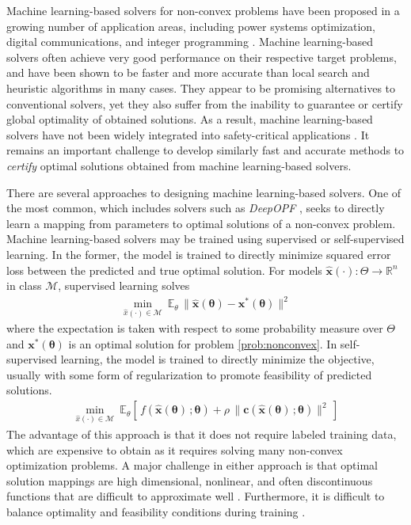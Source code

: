 \documentclass[10pt]{article} %
\theoremstyle{plain}
\theoremstyle{definition}
\theoremstyle{remark}
\begin{document}
Machine learning-based solvers for non-convex problems have been proposed in a growing number of application areas, including power systems optimization, digital communications, and integer programming \citep{van2021machine, samuel2017deep, bertsimas2022online}. Machine learning-based solvers often achieve very good performance on their respective target problems, and have been shown to be faster and more accurate than local search and heuristic algorithms in many cases. They appear to be promising alternatives to conventional solvers, yet they also suffer from the inability to guarantee or certify global optimality of obtained solutions. As a result, machine learning-based solvers have not been widely integrated into safety-critical applications \citep{sun2023online}. It remains an important challenge to develop similarly fast and accurate methods to \textit{certify} optimal solutions obtained from machine learning-based solvers.

There are several approaches to designing machine learning-based solvers. One of the most common, which includes solvers such as \textit{DeepOPF} \citep{pan2022deepopf}, seeks to directly learn a mapping from parameters to optimal solutions of a non-convex problem. Machine learning-based solvers may be trained using supervised or self-supervised learning. In the former, the model is trained to directly minimize squared error loss between the predicted and true optimal solution. For models $\hat{\mathbf{x}}(\cdot): \Theta \to \mathbb{R}^n$ in class $\mathcal{M}$, supervised learning solves
\begin{equation}
\begin{aligned}
    \min_{\hat{x}(\cdot) \in \mathcal{M}}~ \mathbb{E}_\theta\, \| \hat{\mathbf{x}}(\bm{\theta}) - \mathbf{x}^*(\bm{\theta})\|^2
\end{aligned}
\end{equation}
where the expectation is taken with respect to some probability measure over $\Theta$ and $\mathbf{x}^*(\bm{\theta})$ is an optimal solution for problem \cref{prob:nonconvex}{}{}.
In self-supervised learning, the model is trained to directly minimize the objective, usually with some form of regularization to promote feasibility of predicted solutions.
\begin{equation}
\begin{aligned}
    \min_{\hat{x}(\cdot) \in \mathcal{M}}~ \mathbb{E}_\theta \left[ \, f(\hat{\mathbf{x}}(\bm{\theta})\,; \bm{\theta}) + \rho \, \|\mathbf{c}(\hat{\mathbf{x}}(\bm{\theta})\,; \bm{\theta})\|^2 \,\right]
\end{aligned}
\end{equation}
The advantage of this approach is that it does not require labeled training data, which are expensive to obtain as it requires solving many non-convex optimization problems. A major challenge in either approach is that optimal solution mappings are high dimensional, nonlinear, and often discontinuous functions that are difficult to approximate well \citep{pan2022deepopf}. Furthermore, it is difficult to balance optimality and feasibility conditions during training \citep{park2023self}.
\end{document}
